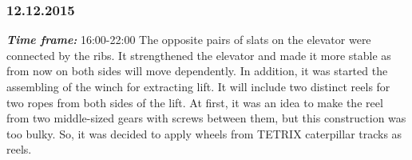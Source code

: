\subsubsection{12.12.2015}
\textit{\textbf{Time frame:}} 16:00-22:00 \newline
The opposite pairs of slats on the elevator were connected by the ribs. It strengthened the elevator and made it more stable as from now on both sides will move dependently.
In addition, it was started the assembling of the winch for extracting lift. It will include two distinct reels for two ropes from both sides of the lift. At first, it was an idea to make the reel from two middle-sized gears with screws between them, but this construction was too bulky. So, it was decided to apply wheels from TETRIX caterpillar tracks as reels.

\begin{figure}[H]
	\begin{minipage}[h]{0.58\linewidth}

\end{minipage}
\end{figure}
